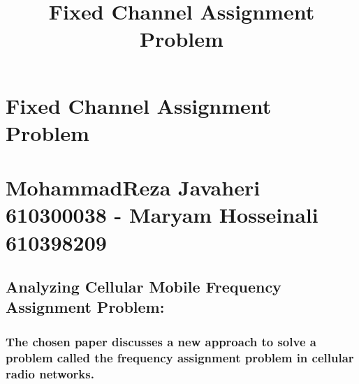 \documentclass[11pt]{article}
\title{Fixed Channel Assignment Problem}
\begin{document}
    
    \maketitle
    
    

    
    \hypertarget{fixed-channel-assignment-problem}{%
\section{\texorpdfstring{ Fixed Channel Assignment
Problem}{  Fixed Channel Assignment Problem}}\label{fixed-channel-assignment-problem}}

    \hypertarget{mohammadreza-javaheri-610300038---maryam-hosseinali-610398209}{%
\section{\texorpdfstring{ MohammadReza Javaheri 610300038 - Maryam
Hosseinali
610398209}{  MohammadReza Javaheri 610300038 - Maryam Hosseinali 610398209}}\label{mohammadreza-javaheri-610300038---maryam-hosseinali-610398209}}

    \hypertarget{analyzing-cellular-mobile-frequency-assignment-problem}{%
\subsection{\texorpdfstring{ Analyzing Cellular Mobile Frequency
Assignment
Problem:}{  Analyzing Cellular Mobile Frequency Assignment Problem:}}\label{analyzing-cellular-mobile-frequency-assignment-problem}}

    \hypertarget{the-chosen-paper-discusses-a-new-approach-to-solve-a-problem-called-the-frequency-assignment-problem-in-cellular-radio-networks.}{%
\subsubsection{\texorpdfstring{ The chosen paper discusses a new
approach to solve a problem called the frequency assignment problem in
cellular radio
networks.}{  The chosen paper discusses a new approach to solve a problem called the frequency assignment problem in cellular radio networks.}}\label{the-chosen-paper-discusses-a-new-approach-to-solve-a-problem-called-the-frequency-assignment-problem-in-cellular-radio-networks.}}
\end{document}
